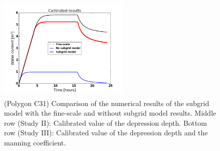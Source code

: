 \documentclass[review,11pt]{elsarticle}
\begin{document}
\begin{figure}
\includegraphics[width=6.2cm, height=5cm]{./figures/POLYGON31/POLYGON31watercontentCalibDDManning.png}
\caption{(Polygon C31) Comparison of the numerical results of the subgrid model with the fine-scale and without subgrid model results. Middle row (Study II): Calibrated value of the depression depth. Bottom row (Study III): Calibrated value of the depression depth and the manning coefficient.}
\label{polygon-C31}
\end{figure}
\end{document}
